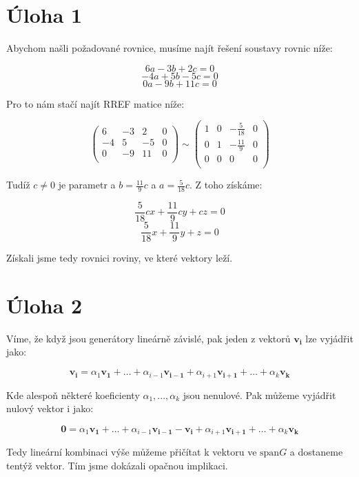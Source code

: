\documentclass{fkssolpub}
\author{Ondřej Sedláček}
\begin{document}
\section{Úloha 1}

Abychom našli požadované rovnice, musíme najít řešení soustavy rovnic níže:

\[
  6 a - 3 b + 2 c = 0
\]
\[
  -4 a + 5 b - 5 c = 0
\]
\[
  0 a - 9 b + 11 c = 0
\]

Pro to nám stačí najít RREF matice níže:

\[
  \left(
  \begin{array}{ccc|c}
    6 & -3 & 2 & 0 \\
    -4 & 5 & -5 & 0 \\
    0 & -9 & 11 & 0 \\
  \end{array}
  \right) \sim \left(
  \begin{array}{ccc|c}
    1 & 0 & -\frac{5}{18} & 0 \\
    0 & 1 & -\frac{11}{9} & 0 \\
    0 & 0 & 0 & 0 \\
  \end{array}
  \right)
\]

Tudíž $c \neq 0$ je parametr a $b = \frac{11}{9} c$ a $a = \frac{5}{18} c$. Z toho získáme:

\[
  \frac{5}{18} c x + \frac{11}{9} c y + c z = 0
\]
\[
  \frac{5}{18} x + \frac{11}{9} y + z = 0
\]

Získali jsme tedy rovnici roviny, ve které vektory leží.

\section{Úloha 2}

Víme, že když jsou generátory lineárně závislé, pak jeden z vektorů $\mathbf{v_i}$ lze vyjádřit jako:

\[
  \mathbf{v_i} = \alpha_1 \mathbf{v_1} + \dots + \alpha_{i - 1} \mathbf{v_{i - 1}} + \alpha_{i + 1} \mathbf{v_{i + 1}} + \dots + \alpha_k \mathbf{v_k}
\]

Kde alespoň některé koeficienty $\alpha_1, ..., \alpha_k$ jsou nenulové. Pak můžeme vyjádřit nulový vektor i jako:

\[
  \mathbf{0} = \alpha_1 \mathbf{v_1} + \dots + \alpha_{i - 1} \mathbf{v_{i - 1}} - \mathbf{v_i} + \alpha_{i + 1} \mathbf{v_{i + 1}} + \dots + \alpha_k \mathbf{v_k}
\]

Tedy lineární kombinaci výše můžeme přičítat k vektoru ve $\text{span} G$ a dostaneme tentýž vektor. Tím jsme dokázali opačnou implikaci.
\end{document}
